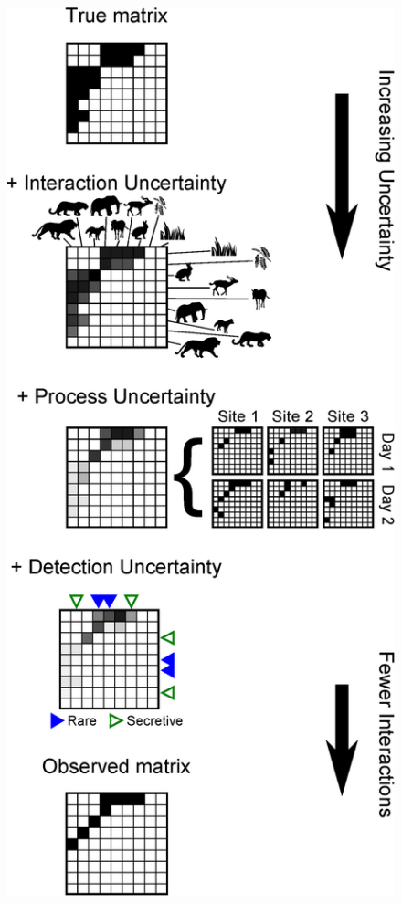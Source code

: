 \documentclass[12pt]{article}
\begin{document}
\begin{figure}[h!]
\begin{center}
    \includegraphics*[height=.5\textheight]{figures/conceptual_fig.eps}
    \end{center}
    \end{figure}
\end{document}

